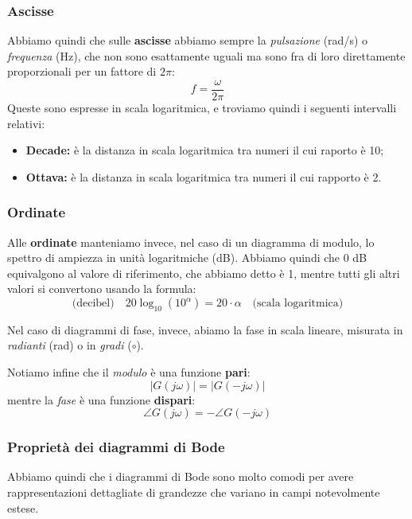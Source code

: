 \documentclass[a4paper,11pt]{article}
\begin{document}
\subsubsection{Ascisse}
Abbiamo quindi che sulle \textbf{ascisse} abbiamo sempre la \textit{pulsazione} (rad/s) o \textit{frequenza} (Hz), che non sono esattamente uguali ma sono fra di loro direttamente proporzionali per un fattore di $2\pi$:
$$
f = \frac{\omega}{2\pi}
$$
Queste sono espresse in scala logaritmica, e troviamo quindi i seguenti intervalli relativi:
\begin{itemize}
	\item \textbf{Decade:} è la distanza in scala logaritmica tra numeri il cui raporto è 10;
	\item \textbf{Ottava:} è la distanza in scala logaritmica tra numeri il cui rapporto è 2.
\end{itemize}

\subsubsection{Ordinate}
Alle \textbf{ordinate} manteniamo invece, nel caso di un diagramma di modulo, lo spettro di ampiezza in unità logaritmiche (dB).
Abbiamo quindi che 0 dB equivalgono al valore di riferimento, che abbiamo detto è 1, mentre tutti gli altri valori si convertono usando la formula:
$$
\text{(decibel)} \quad 20 \log_{10}(10^\alpha) = 20 \cdot \alpha \quad \text{(scala logaritmica)}
$$

Nel caso di diagrammi di fase, invece, abiamo la fase in scala lineare, misurata in \textit{radianti} (rad) o in \textit{gradi} ($\circ$).

\par\bigskip

Notiamo infine che il \textit{modulo} è una funzione \textbf{pari}:
$$
|G(j \omega)| = |G(-j \omega)|
$$
mentre la \textit{fase} è una funzione \textbf{dispari}:
$$
\angle G(j \omega) = - \angle G(-j \omega)
$$

\subsubsection{Proprietà dei diagrammi di Bode}
Abbiamo quindi che i diagrammi di Bode sono molto comodi per avere rappresentazioni dettagliate di grandezze che variano in campi notevolmente estese.
\end{document}
